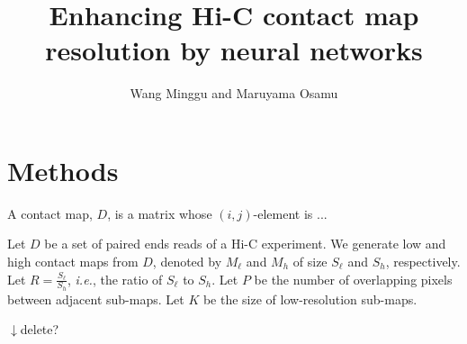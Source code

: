 \documentclass{article}
\begin{document}
\title{Enhancing Hi-C contact map resolution by neural networks}
\author{Wang Minggu and Maruyama Osamu}
\maketitle

%

\section{Methods}

A contact map, $D$, is a matrix whose $(i,j)$-element is ...


Let $D$ be a set of paired ends reads of a Hi-C experiment. 
We generate low and high contact maps from $D$, 
denoted by $M_\ell$ and $M_h$ of size $S_\ell$ and $S_h$, respectively.  
Let $R = \frac{S_\ell}{S_h}$, \textit{i.e.}, 
the ratio of $S_\ell$ to $S_h$.  
Let $P$ be the number of overlapping pixels between adjacent sub-maps.
Let $K$ be the size of low-resolution sub-maps.

$\downarrow$delete?\newline



\end{document}
